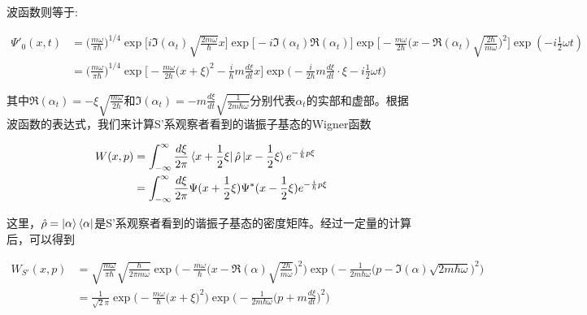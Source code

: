 \documentclass[a4paper]{article}
\begin{document}
        波函数则等于:

        \begin{equation}
            \begin{split}   
                \Psi'_0(x,t) &= \bigg(\frac{m\omega}{\pi\hbar}\bigg)^{1/4} \exp\biggl[i\Im(\alpha_t)\sqrt{\frac{2m\omega}{\hbar}}x\biggr] \exp\biggl[-i\Im(\alpha_t)\Re(\alpha_t)\biggr] \exp\biggl[-\frac{m\omega}{2\hbar} \bigl(x-\Re(\alpha_t)\sqrt{\frac{2\hbar}{m\omega}}\bigr)^2 \biggr] \exp(-i\frac{1}{2}\omega t) \\
                    &= \bigg(\frac{m\omega}{\pi\hbar}\bigg)^{1/4} \exp\biggl[-\frac{m\omega}{2\hbar} \bigl(x+\xi\bigr)^2-\frac{i}{\hbar}m\frac{d\xi}{dt}x\biggr] \exp\biggl(-\frac{i}{2\hbar}m\frac{d\xi}{dt}\cdot\xi-i\frac{1}{2}\omega t \biggr)
            \end{split}
        \end{equation}

        其中$\Re(\alpha_t)=-\xi\sqrt{\frac{m\omega}{2\hbar}}$和$\Im(\alpha_t)=-m\frac{d\xi}{dt}\sqrt{\frac{1}{2m\hbar\omega}}$分别代表$\alpha_t$的实部和虚部。根据波函数的表达式，我们来计算S'系观察者看到的谐振子基态的Wigner函数

        \begin{equation}
            \begin{split}
                W(x, p) &= \int_{-\infty}^\infty \frac{d\xi}{2\pi}\bra{x+\frac{1}{2}\xi}\hat{\rho}\ket{x-\frac{1}{2}\xi} e^{-\frac{i}{\hbar}p\xi} \\
                    &= \int_{-\infty}^\infty\frac{d\xi}{2\pi} \Psi(x+\frac{1}{2}\xi)\Psi^*(x-\frac{1}{2}\xi) e^{-\frac{i}{\hbar}p\xi}
            \end{split}
        \end{equation}

        这里，$\hat{\rho}=\ket{\alpha}\bra{\alpha}$是S'系观察者看到的谐振子基态的密度矩阵。经过一定量的计算后，可以得到

        \begin{equation}\label{Wigner}
            \begin{split}
                W_{S'}(x, p) &= \sqrt{\frac{m\omega}{\pi\hbar}} \sqrt{\frac{\hbar}{2\pi m\omega}} \exp\biggl(-\frac{m\omega}{\hbar}\bigl(x-\Re(\alpha)\sqrt{\frac{2\hbar}{m\omega}}\bigr)^2\biggr) \exp\biggl(-\frac{1}{2m\hbar\omega}\bigl(p-\Im(\alpha)\sqrt{2m\hbar\omega}\bigr)^2\biggr) \\
                    &= \frac{1}{\sqrt{2}\pi} \exp\biggl(-\frac{m\omega}{\hbar}\bigl(x+\xi\bigr)^2\biggr) \exp\biggl(-\frac{1}{2m\hbar\omega}\bigl(p+m\frac{d\xi}{dt}\bigr)^2\biggr)
            \end{split}
        \end{equation}
\end{document}
